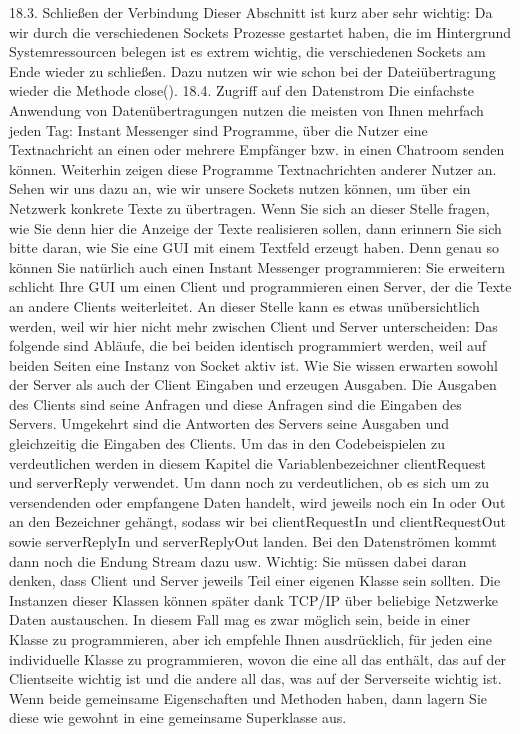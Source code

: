 18.3.	Schließen der Verbindung
Dieser Abschnitt ist kurz aber sehr wichtig: Da wir durch die verschiedenen Sockets Prozesse gestartet haben, die im Hintergrund Systemressourcen belegen ist es extrem wichtig, die verschiedenen Sockets am Ende wieder zu schließen. Dazu nutzen wir wie schon bei der Dateiübertragung wieder die Methode close().
18.4.	Zugriff auf den Datenstrom
Die einfachste Anwendung von Datenübertragungen nutzen die meisten von Ihnen mehrfach jeden Tag: Instant Messenger sind Programme, über die Nutzer eine Textnachricht an einen oder mehrere Empfänger bzw. in einen Chatroom senden können. Weiterhin zeigen diese Programme Textnachrichten anderer Nutzer an. Sehen wir uns dazu an, wie wir unsere Sockets nutzen können, um über ein Netzwerk konkrete Texte zu übertragen.
Wenn Sie sich an dieser Stelle fragen, wie Sie denn hier die Anzeige der Texte realisieren sollen, dann erinnern Sie sich bitte daran, wie Sie eine GUI mit einem Textfeld erzeugt haben. Denn genau so können Sie natürlich auch einen Instant Messenger programmieren: Sie erweitern schlicht Ihre GUI um einen Client und programmieren einen Server, der die Texte an andere Clients weiterleitet.
An dieser Stelle kann es etwas unübersichtlich werden, weil wir hier nicht mehr zwischen Client und Server unterscheiden: Das folgende sind Abläufe, die bei beiden identisch programmiert werden, weil auf beiden Seiten eine Instanz von Socket aktiv ist.
Wie Sie wissen erwarten sowohl der Server als auch der Client Eingaben und erzeugen Ausgaben. Die Ausgaben des Clients sind seine Anfragen und diese Anfragen sind die Eingaben des Servers. Umgekehrt sind die Antworten des Servers seine Ausgaben und gleichzeitig die Eingaben des Clients. Um das in den Codebeispielen zu verdeutlichen werden in diesem Kapitel die Variablenbezeichner clientRequest und serverReply verwendet. Um dann noch zu verdeutlichen, ob es sich um zu versendenden oder empfangene Daten handelt, wird jeweils noch ein In oder Out an den Bezeichner gehängt, sodass wir bei clientRequestIn und clientRequestOut sowie serverReplyIn und serverReplyOut landen. Bei den Datenströmen kommt dann noch die Endung Stream dazu usw.
Wichtig:
Sie müssen dabei daran denken, dass Client und Server jeweils Teil einer eigenen Klasse sein sollten. Die Instanzen dieser Klassen können später dank TCP/IP über beliebige Netzwerke Daten austauschen. In diesem Fall mag es zwar möglich sein, beide in einer Klasse zu programmieren, aber ich empfehle Ihnen ausdrücklich, für jeden eine individuelle Klasse zu programmieren, wovon die eine all das enthält, das auf der Clientseite wichtig ist und die andere all das, was auf der Serverseite wichtig ist. Wenn beide gemeinsame Eigenschaften und Methoden haben, dann lagern Sie diese wie gewohnt in eine gemeinsame Superklasse aus.
